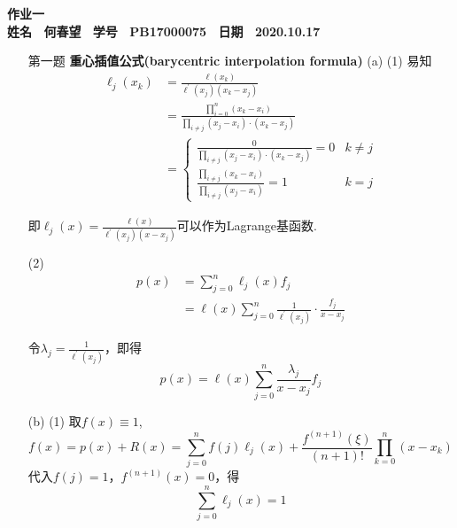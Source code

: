\documentclass[12pt,a4paper,utf8]{ctexart}
\begin{document}

\begin{center}
\textbf{作业一}\\
\textbf{姓名 ~何春望~ 学号 ~PB17000075~ 日期 ~2020.10.17}\\
\end{center}
\textit{}
\vspace{\baselineskip}

\begin{enumerate}
\item[第一题] \textbf{重心插值公式(barycentric interpolation formula)}  
\subitem(a)
\subsubitem(1)
易知
\begin{equation}
   \begin{aligned}
      \ell_{j}\left(x_{k}\right)&=\frac{\ell\left(x_{k}\right)}{\ell^{'}(x_j)(x_k-x_j)}\\
      &=\frac{\prod\limits_{i=0}^n (x_k-x_i)}{\prod\limits_{i \neq j} (x_j-x_i) \cdot (x_k-x_j)}\\
      &=\left\{\begin{array}{rr}
         \frac{0}{\prod\limits_{i \neq j} (x_j-x_i) \cdot (x_k-x_j)} = 0 & k \neq j \\
         \frac{\prod\limits_{i \neq j} (x_k-x_i)}{\prod\limits_{i \neq j} (x_j-x_i)} = 1 & k = j
      \end{array}\right.
   \end{aligned}
\end{equation}

即$\ell_j(x)=\frac{\ell(x)}{\ell^{'}(x_j)(x-x_j)}$可以作为Lagrange基函数.

\subsubitem(2)
\begin{equation}
   \begin{aligned}
      p(x) &= \sum_{j = 0}^n \ell_j(x)f_j\\
      &= \ell(x) \sum_{j = 0}^n \frac{1}{\ell^{'}(x_j)} \cdot \frac{f_j}{x - x_j}
   \end{aligned}
\end{equation}

令$\lambda_j=\frac{1}{\ell^{'}(x_j)}$，即得
\begin{equation}
   p(x) = \ell(x) \sum_{j = 0}^n \frac{\lambda_j}{x - x_j} f_j
\end{equation}

\subitem(b)
\subsubitem(1)
取$f(x) \equiv 1$,
\begin{equation}
   f(x)=p(x)+R(x)=\sum_{j=0}^n f(j)\ell_j(x) + \frac{f^{(n+1)}(\xi)}{(n+1)!} \prod_{k=0}^n (x-x_k)
\end{equation}
代入$f(j) = 1$，$f^{(n+1)}(x) = 0$，得
\begin{equation}
   \sum_{j = 0}^n \ell_j(x) = 1
\end{equation}


\end{enumerate}
\end{document}
